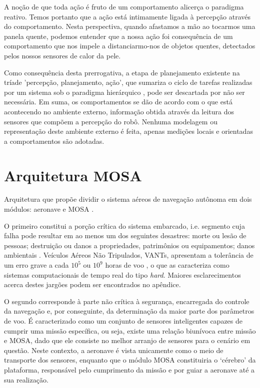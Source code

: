 A noção de que toda ação é fruto de um comportamento alicerça o paradigma reativo.
Temos portanto que a ação está intimamente ligada à percepção através do comportamento.
Nesta perspectiva, quando afastamos a mão ao tocarmos uma panela quente, podemos entender que a nossa ação foi consequência de um comportamento que 
nos impele a distanciarmo-nos de objetos quentes, detectados pelos nossos sensores de calor da pele.

Como consequência desta prerrogativa, a etapa de planejamento existente na tríade 'percepção, planejamento, ação', que sumariza 
o ciclo de tarefas realizadas por um sistema sob o paradigma hierárquico \cite{murphy,roseli}, pode ser descartada por não ser necessária.
Em suma, os comportamentos se dão de acordo com o que está acontecendo no ambiente externo, informação obtida através da leitura dos sensores que 
compõem a percepção do robô.
Nenhuma modelagem ou representação deste ambiente externo é feita, apenas medições locais e orientadas a comportamentos são adotadas.

\section{Arquitetura MOSA}

Arquitetura que propõe dividir o sistema aéreos de navegação autônoma em dois módulos: aeronave e MOSA \cite{mosa_proposal}.

O primeiro constitui a porção crítica do sistema embarcado, i.e. segmento cuja falha pode resultar em ao menos um dos seguintes desastres: morte 
ou lesão de pessoas; destruição ou danos a propriedades, patrimônios ou equipamentos; danos ambientais \cite{safety}.
Veículos Aéreos Não Tripulados, VANTs, apresentam a tolerância de um erro grave a cada $10^5$ ou $10^9$ horas de voo \cite{hard}, o que as 
caracteriza 
como sistemas computacionais de tempo real do tipo \textit{hard}. 
Maiores esclarecimentos acerca destes jargões podem ser encontrados no apêndice.

O segundo corresponde à parte não crítica à segurança, encarregada do controle da navegação e, por conseguinte, da determinação da maior parte dos 
parâmetros de voo. É caracterizado como um conjunto de sensores inteligentes capazes de cumprir uma missão específica, ou seja, 
existe uma relação biunívoca entre missão e MOSA, dado que ele consiste no melhor arranjo de sensores para o cenário em questão. Neste contexto, a 
aeronave é vista unicamente como o meio de transporte dos sensores, enquanto que o módulo MOSA constituiria o \textquoteleft cérebro\textquoteright{}  
da plataforma, responsável pelo cumprimento da missão e por guiar a aeronave até a sua realização.

